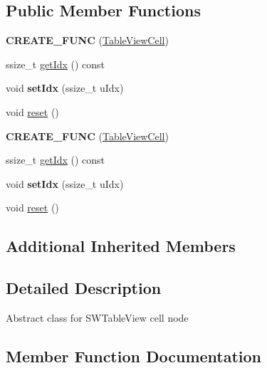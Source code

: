 \subsection*{Public Member Functions}
\begin{DoxyCompactItemize}
\item 
\mbox{\label{classTableViewCell_a62d939e1e78b2765f63edf042dc73cac}} 
{\bfseries C\+R\+E\+A\+T\+E\+\_\+\+F\+U\+NC} (\hyperlink{classTableViewCell}{Table\+View\+Cell})
\item 
ssize\+\_\+t \hyperlink{classTableViewCell_af8d8629559291a8d08cf93bd544d184b}{get\+Idx} () const
\item 
\mbox{\label{classTableViewCell_a6f2c0e9b9d59fa94ad6f66dd74ed0f4b}} 
void {\bfseries set\+Idx} (ssize\+\_\+t u\+Idx)
\item 
void \hyperlink{classTableViewCell_a371f91eea4a4355219335c8895905ffd}{reset} ()
\item 
\mbox{\label{classTableViewCell_a62d939e1e78b2765f63edf042dc73cac}} 
{\bfseries C\+R\+E\+A\+T\+E\+\_\+\+F\+U\+NC} (\hyperlink{classTableViewCell}{Table\+View\+Cell})
\item 
ssize\+\_\+t \hyperlink{classTableViewCell_af8d8629559291a8d08cf93bd544d184b}{get\+Idx} () const
\item 
\mbox{\label{classTableViewCell_a6f2c0e9b9d59fa94ad6f66dd74ed0f4b}} 
void {\bfseries set\+Idx} (ssize\+\_\+t u\+Idx)
\item 
void \hyperlink{classTableViewCell_a55e25c8553f7fc98b3e6d26bfd01fb4c}{reset} ()
\end{DoxyCompactItemize}
\subsection*{Additional Inherited Members}


\subsection{Detailed Description}
Abstract class for S\+W\+Table\+View cell node 

\subsection{Member Function Documentation}
\mbox{\label{classTableViewCell_af8d8629559291a8d08cf93bd544d184b}} 
